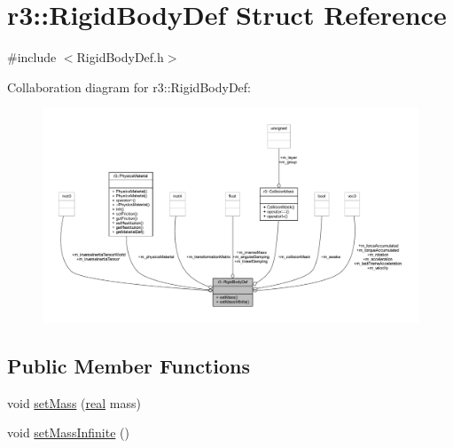 \hypertarget{structr3_1_1_rigid_body_def}{}\section{r3\+:\+:Rigid\+Body\+Def Struct Reference}
\label{structr3_1_1_rigid_body_def}


{\ttfamily \#include $<$Rigid\+Body\+Def.\+h$>$}



Collaboration diagram for r3\+:\+:Rigid\+Body\+Def\+:\nopagebreak
\begin{figure}[H]
\begin{center}
\leavevmode
\includegraphics[width=350pt]{structr3_1_1_rigid_body_def__coll__graph}
\end{center}
\end{figure}
\subsection*{Public Member Functions}
\begin{DoxyCompactItemize}
\item 
void \mbox{\hyperlink{structr3_1_1_rigid_body_def_a7b84fd988312a41f84ac0505f6c3de47}{set\+Mass}} (\mbox{\hyperlink{namespacer3_ab2016b3e3f743fb735afce242f0dc1eb}{real}} mass)
\item 
void \mbox{\hyperlink{structr3_1_1_rigid_body_def_a6912018eac59c46be887cf07e7aadc36}{set\+Mass\+Infinite}} ()
\end{DoxyCompactItemize}
